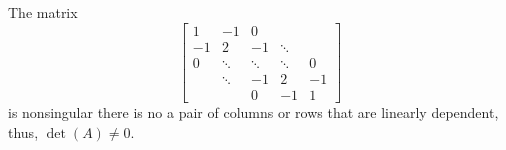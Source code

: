 \documentclass{article}
\begin{document}
\\
\\

The matrix 
\begin{equation*}
    \begin{bmatrix}
        1 & -1 & 0 \\
        -1 & 2 & -1 & \ddots \\
        0 & \ddots & \ddots & \ddots & 0 \\
         & \ddots & -1 & 2 & -1 \\
        & & 0 & -1 & 1
    \end{bmatrix}
\end{equation*}
is nonsingular there is no a pair of columns or rows that are linearly dependent, thus, $\det(A) \neq 0$.
\end{document}
